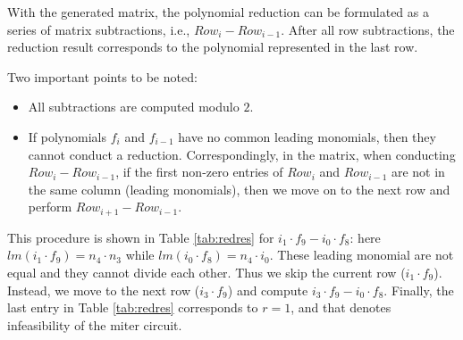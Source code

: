 \begin{Example}
	With the generated matrix, the polynomial reduction can be
        formulated as a series of matrix subtractions,  
	i.e., $Row_{i}- Row_{i-1}$. After all row subtractions, the
        reduction result corresponds to the polynomial represented in
        the last row. 

        Two important points to be noted:
	\begin{itemize}
	\item All subtractions are computed modulo $2$.
	\item If polynomials $f_{i}$ and $f_{i-1}$ have no common
          leading monomials, then they cannot conduct a
          reduction. Correspondingly, in the matrix, when conducting
          $Row_{i}- Row_{i-1}$, if the first non-zero entries of
          $Row_{i}$ and $Row_{i-1}$ are not in the same column
          (leading monomials), then we move on to the next row and
          perform $Row_{i+1}-Row_{i-1}$.  
	\end{itemize}

	 This procedure is shown in Table \ref{tab:redres} for $i_1
         \cdot f_{9} - i_0\cdot f_{8}$: here  $lm(i_1 \cdot
         f_{9})=n_{4}\cdot n_{3}$ while $lm(i_0\cdot f_{8})=n_{4}\cdot
         i_0$. These leading monomial are not equal and they cannot
         divide each other. Thus we skip the current row ($i_1 \cdot
         f_{9}$). Instead, we move to the next row ($i_3 \cdot f_{9}$)
         and compute $i_3 \cdot f_{9}-i_0\cdot f_{8}$.   Finally, the
         last entry in Table \ref{tab:redres} corresponds to $r = 1$,
         and that denotes infeasibility of the miter circuit.


\end{Example}

